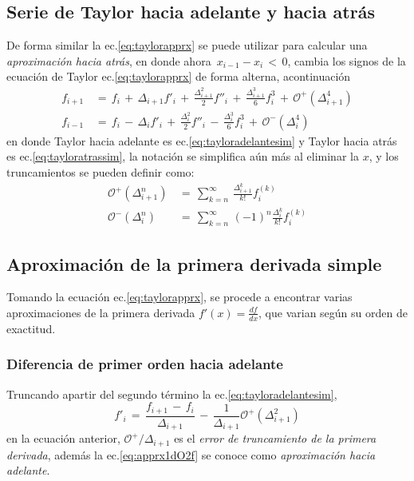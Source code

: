 \documentclass[9pt,technote,twoside,letterpaper,onecolumn]{IEEEtran}
\begin{document}
\subsection{Serie de Taylor hacia adelante y hacia atrás}
\label{sec:backford}
 De forma similar la ec.\ref{eq:taylorapprx} se puede utilizar para calcular una \emph{aproximación hacia atrás}, en donde ahora $\,x_{i-1}-x_i\,<\,0$, cambia los signos de la ecuación de Taylor ec.\ref{eq:taylorapprx} de forma alterna, acontinuación
\begin{align}
  f_{i+1}&\,=\,f_i\,+\,\Delta_{i+1}f'_i\,+\,\frac{\Delta^2_{i+1}}{2}f''_i\,+\,\frac{\Delta^3_{i+1}}{6}f^3_i\,+\,\mathcal{O}^+(\Delta^4_{i+1})  \label{eq:tayloradelantesim}
  \\
 f_{i-1}&\,=\,f_i\,-\,\Delta_{i}f'_i\,+\,\frac{\Delta^2_{i}}{2}f''_i\,-\,\frac{\Delta^3_{i}}{6}f^3_i\,+\,\mathcal{O}^-(\Delta^4_{i}) 
  \label{eq:tayloratrassim}
\end{align}
en donde Taylor hacia adelante es ec.\ref{eq:tayloradelantesim} y Taylor hacia atrás es ec.\ref{eq:tayloratrassim},  la notación se simplifica aún más al eliminar la $x$, y los truncamientos se pueden definir como:
\begin{align}
  \mathcal{O}^+(\Delta^n_{i+1})&\,=\,\sum^\infty_{k=n}\,\frac{\Delta^k_{i+1}}{k!}f^{(k)}_i\label{eq:Otayloradelante}\\
  \mathcal{O}^-(\Delta^n_{i})&\,=\,\sum^\infty_{k=n}\,(-1)^n\frac{\Delta^k_i}{k!}f^{(k)}_i\label{eq:Otayloratras}
\end{align}

\subsection{Aproximación de la primera derivada simple}
\label{sec:primder}

Tomando la ecuación ec.\ref{eq:taylorapprx}, se procede a encontrar varias aproximaciones de la primera derivada $f'(x)=\frac{df}{dx}$, que varian según su orden de exactitud.

\subsubsection{Diferencia de primer orden hacia adelante}
\label{sec:dif1Da}
Truncando apartir del segundo término la ec.\ref{eq:tayloradelantesim},
\begin{equation}
  f'_i\,=\,\frac{f_{i+1}\,-\,f_i}{\Delta_{i+1}}\,-\,\frac{1}{\Delta_{i+1}}\mathcal{O}^+(\Delta^2_{i+1})
  \label{eq:apprx1dO2f}
\end{equation}
en la ecuación anterior, $\mathcal{O}^+/\Delta_{i+1}$ es el \emph{error de truncamiento de la primera derivada}, además la ec.\ref{eq:apprx1dO2f} se conoce como \emph{aproximación hacia adelante}.
\end{document}
